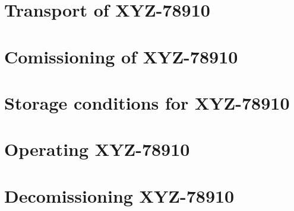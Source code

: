 \documentclass[11pt]{report}
\begin{document}
\newcommand{\productname}{XYZ-78910}
\chapter{Transport of \productname}
\blindtext
\chapter{Comissioning of \productname}
\blindtext
\chapter{Storage conditions for \productname}
\blindtext
\chapter{Operating \productname}
\blindtext
\chapter{Decomissioning \productname}
\end{document}
